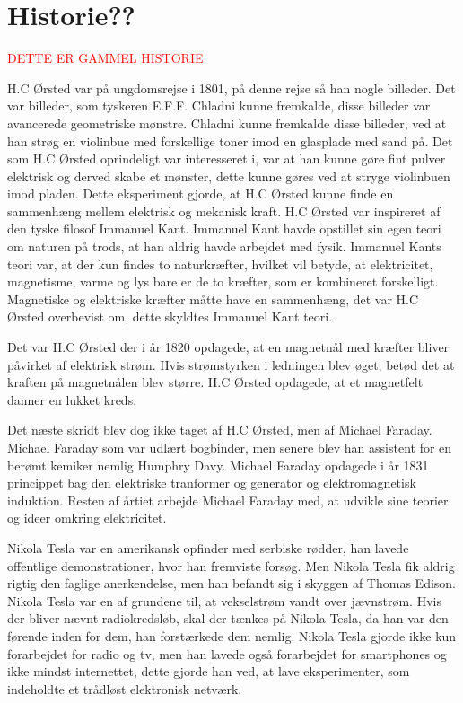 \section{Historie??}

\textcolor{red}{DETTE ER GAMMEL HISTORIE}

H.C Ørsted var på ungdomsrejse i 1801, på denne rejse så han nogle billeder. Det var billeder, som tyskeren E.F.F. Chladni kunne fremkalde, disse billeder var avancerede geometriske mønstre. Chladni kunne fremkalde disse billeder, ved at han strøg en violinbue med forskellige toner imod en glasplade med sand på. Det som H.C Ørsted oprindeligt var interesseret i, var at han kunne gøre fint pulver elektrisk og derved skabe et mønster, dette kunne gøres ved at stryge violinbuen imod pladen. Dette eksperiment gjorde, at H.C Ørsted kunne finde en sammenhæng mellem elektrisk og mekanisk kraft. H.C Ørsted var inspireret af den tyske filosof Immanuel Kant. Immanuel Kant havde opstillet sin egen teori om naturen på trods, at han aldrig havde arbejdet med fysik. Immanuel Kants teori var, at der kun findes to naturkræfter, hvilket vil betyde, at elektricitet, magnetisme, varme og lys bare er de to kræfter, som er kombineret forskelligt. Magnetiske og elektriske kræfter måtte have en sammenhæng, det var H.C Ørsted overbevist om, dette skyldtes Immanuel Kant teori. 

Det var H.C Ørsted der i år 1820 opdagede, at en magnetnål med kræfter bliver påvirket af elektrisk strøm. Hvis strømstyrken i ledningen blev øget, betød det at kraften på magnetnålen blev større. H.C Ørsted opdagede, at et magnetfelt danner en lukket kreds. 

Det næste skridt blev dog ikke taget af H.C Ørsted, men af Michael Faraday. Michael Faraday som var udlært bogbinder, men senere blev han assistent for en berømt kemiker nemlig Humphry Davy. Michael Faraday opdagede i år 1831 princippet bag den elektriske tranformer og generator og elektromagnetisk induktion. Resten af årtiet arbejde Michael Faraday med, at udvikle sine teorier og ideer omkring elektricitet. 

Nikola Tesla var en amerikansk opfinder med serbiske rødder, han lavede offentlige demonstrationer, hvor han fremviste forsøg. Men Nikola Tesla fik aldrig rigtig den faglige anerkendelse, men han befandt sig i skyggen af Thomas Edison. Nikola Tesla var en af grundene til, at vekselstrøm vandt over jævnstrøm. Hvis der bliver nævnt radiokredsløb, skal der tænkes på Nikola Tesla, da han var den førende inden for dem, han forstærkede dem nemlig. Nikola Tesla gjorde ikke kun forarbejdet for radio og tv, men han lavede også forarbejdet for smartphones og ikke mindst internettet, dette gjorde han ved, at lave eksperimenter, som indeholdte et trådløst elektronisk netværk.

